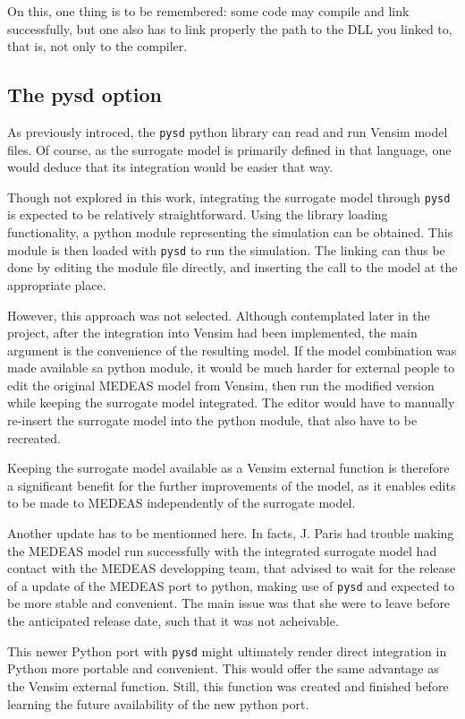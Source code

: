 On this, one thing is to be remembered: some code may compile and link successfully, but one also has to link properly the path to the DLL you linked to, that is, not only to the compiler.

\subsection{The pysd option}

As previously introced, the \texttt{pysd} python library can read and run Vensim model files. Of course, as the surrogate model is primarily defined in that language, one would deduce that its integration would be easier that way.

Though not explored in this work, integrating the surrogate model through \texttt{pysd} is expected to be relatively straightforward. Using the library loading functionality, a python module representing the simulation can be obtained. This module is then loaded with \texttt{pysd} to run the simulation. The linking can thus be done by editing the module file directly, and inserting the call to the model at the appropriate place. 

However, this approach was not selected. Although contemplated later in the project, after the integration into Vensim had been implemented, the main argument is the convenience of the resulting model. If the model combination was made available sa python module, it would be much harder for external people to edit the original MEDEAS model from Vensim, then run the modified version while keeping the surrogate model integrated. The editor would have to manually re-insert the surrogate model into the python module, that also have to be recreated.

Keeping the surrogate model available as a Vensim external function is therefore a significant benefit for the further improvements of the model, as it enables edits to be made to MEDEAS independently of the surrogate model.

Another update has to be mentionned here. In facts, J. Paris had trouble making the MEDEAS model run successfully with the integrated surrogate model had contact with the MEDEAS developping team, that advised to wait for the release of a update of the MEDEAS port to python, making use of \texttt{pysd} and expected to be more stable and convenient. The main issue was that she were to leave before the anticipated release date, such that it was not acheivable.

This newer Python port with \texttt{pysd} might ultimately render direct integration in Python more portable and convenient. This would offer the same advantage as the Vensim external function. Still, this function was created and finished before learning the future availability of the new python port.

